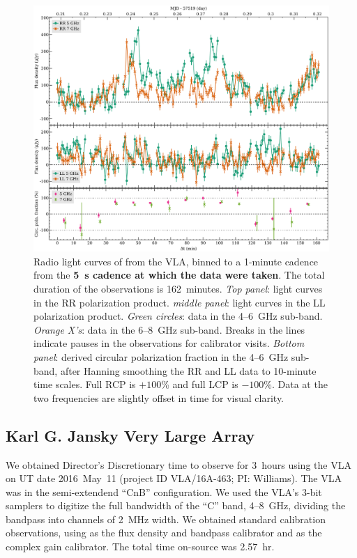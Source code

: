 \documentclass[twocolumn, times]{aastex6}
\begin{document}
\begin{figure}[tbp]
  \includegraphics[width=\linewidth]{vla}
  \caption{Radio light curves of  from the VLA, binned to a
    1-minute cadence from the \textbf{5~s cadence at which the data were
      taken}. The total duration of the observations is 162~minutes.
    \textit{Top panel}: light curves in the RR polarization product.
    \textit{middle panel}: light curves in the LL polarization product.
    \textit{Green circles}: data in the 4--6~GHz sub-band. \textit{Orange
      X's}: data in the 6--8~GHz sub-band. Breaks in the lines indicate pauses
    in the observations for calibrator visits. \textit{Bottom panel}: derived
    circular polarization fraction in the 4--6~GHz sub-band, after Hanning
    smoothing the RR and LL data to 10-minute time scales. Full RCP is
    ${+}100$\% and full LCP is ${-}100$\%. Data at the two frequencies are
    slightly offset in time for visual clarity.}
  \label{f.vla}
\end{figure}

\subsection{Karl G. Jansky Very Large Array}

We obtained Director's Discretionary time to observe  for 3~hours
using the VLA on UT date 2016~May~11 (project ID VLA/16A-463; PI: Williams).
The VLA was in the semi-extendend ``CnB'' configuration. We used the VLA's
3-bit samplers to digitize the full bandwidth of the ``C'' band, 4--8~GHz,
dividing the bandpass into channels of 2~MHz width. We obtained standard
calibration observations, using  as the flux density and bandpass
calibrator and  as the complex gain calibrator. The total time
on-source was 2.57~hr.
\end{document}
